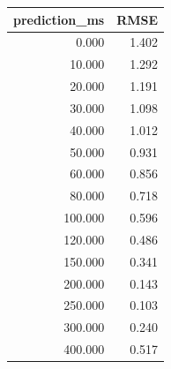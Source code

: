 \begin{tabular}{rr}
\toprule
prediction_ms & RMSE \\
\midrule
0.000 & 1.402 \\
10.000 & 1.292 \\
20.000 & 1.191 \\
30.000 & 1.098 \\
40.000 & 1.012 \\
50.000 & 0.931 \\
60.000 & 0.856 \\
80.000 & 0.718 \\
100.000 & 0.596 \\
120.000 & 0.486 \\
150.000 & 0.341 \\
200.000 & 0.143 \\
250.000 & 0.103 \\
300.000 & 0.240 \\
400.000 & 0.517 \\
\bottomrule
\end{tabular}

